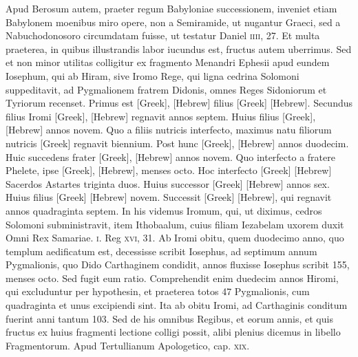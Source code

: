 \begin{parnumbers}
{}
\lnr{}Apud Berosum autem, praeter
regum Babyloniae successionem, inveniet etiam Babylonem moenibus
miro opere, non a Semiramide, ut nugantur Graeci, sed a Nabuchodonosoro
circumdatam fuisse, ut testatur Daniel \textsc{iiii}, 27.
\lnr{}Et
multa praeterea, in quibus illustrandis labor iucundus est, fructus
autem uberrimus.
\lnr{}Sed et non minor utilitas colligitur ex fragmento
Menandri Ephesii apud eundem Iosephum, qui ab Hiram, sive
Iromo Rege, qui ligna cedrina Solomoni suppeditavit, ad Pygmalionem
fratrem Didonis, omnes Reges Sidoniorum et Tyriorum
recenset.
\lnr{}Primus est \textgreek{[Greek]}, \texthebrew{[Hebrew]}
 filius \textgreek{[Greek]} \texthebrew{[Hebrew]}.
\lnr{}Secundus filius Iromi \textgreek{[Greek]}, \texthebrew{[Hebrew]}
 regnavit annos septem.
\lnr{}Huius filius \textgreek{[Greek]}, \texthebrew{[Hebrew]} annos novem.
\lnr{}Quo a filiis nutricis
interfecto, maximus natu filiorum nutricis \textgreek{[Greek]} regnavit
biennium.
\lnr{}Post hunc \textgreek{[Greek]}, \texthebrew{[Hebrew]} annos
duodecim.
\lnr{}Huic succedens frater \textgreek{[Greek]}, \texthebrew{[Hebrew]} annos novem.
\lnr{}Quo interfecto a fratere Phelete, ipse
 \textgreek{[Greek]}, \texthebrew{[Hebrew]}, menses octo.
\lnr{}Hoc interfecto \textgreek{[Greek]} \texthebrew{[Hebrew]}
 Sacerdos Astartes triginta
duos.
\lnr{}Huius successor \textgreek{[Greek]} \texthebrew{[Hebrew]} annos sex.
\lnr{}Huius filius
\textgreek{[Greek]} \texthebrew{[Hebrew]} novem.
\lnr{}Successit \textgreek{[Greek]} \texthebrew{[Hebrew]}, qui regnavit
annos quadraginta septem.
\lnr{}In his videmus Iromum, qui, ut
diximus, cedros Solomoni subministravit, item Ithobaalum, cuius
filiam Iezabelam uxorem duxit Omni Rex Samariae. \textsc{i}. Reg \textsc{xvi},
31.
\lnr{}Ab Iromi obitu, quem duodecimo anno, quo templum aedificatum
est, decessisse scribit Iosephus, ad septimum annum Pygmalionis,
quo Dido Carthaginem condidit, annos fluxisse Iosephus
scribit 155, menses octo.
\lnr{}Sed fugit eum ratio.
\lnr{}Comprehendit
enim duedecim annos Hiromi, qui excluduntur per hypothesin,
et praeterea totos 47 Pygmalionis, cum quadraginta et
unus excipiendi sint.
\lnr{}Ita ab obitu Iromi, ad Carthaginis conditum
fuerint anni tantum 103.
\lnr{}Sed de his omnibus Regibus, et
eorum annis, et quis fructus ex huius fragmenti lectione colligi
possit, alibi plenius dicemus in libello Fragmentorum.
\lnr{}Apud Tertullianum Apologetico, cap. \textsc{xix}.


\end{parnumbers}
